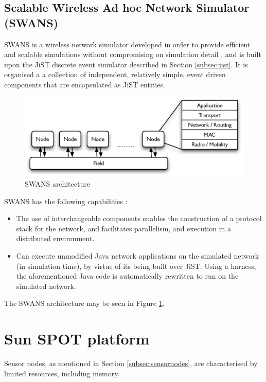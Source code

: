 \subsection{Scalable Wireless Ad hoc Network Simulator (SWANS)}
SWANS is a wireless network simulator developed in order to provide efficient
and scalable simulations without compromising on simulation detail \cite{barr_SWANS},
and is built upon the JiST discrete event simulator described in Section \ref{subsec:jist}. 
It is organised a a collection of independent, relatively simple, event driven
components that are encapsulated as JiST entities. 

\begin{figure}[h]
\centering
\includegraphics[width=\textwidth]{img/SWANS_architecture.eps} 
\caption[SWANS architecture]{SWANS architecture}
\label{Fig:SWANS_architecture}
\end{figure} 
  
SWANS has the following capabilities \cite{barr_SWANS}:

\begin{itemize}
\item The use of
interchangeable components enables the construction of a protocol stack for the
network, and facilitates parallelism, and execution in a distributed environment.
\item Can execute unmodified Java network applications on the
simulated network (in simulation time), by virtue of its being built over
JiST. Using a harness, the aforementioned Java code is automatically rewritten to
run on the simulated network.  
\end{itemize}
   
The SWANS architecture may be seen in Figure \ref{Fig:SWANS_architecture}. 

\section {Sun SPOT platform} \label{sec:sunspots}

Sensor nodes, as mentioned in Section \ref{subsec:sensornodes}, are
characterised by limited resources, including memory. 

